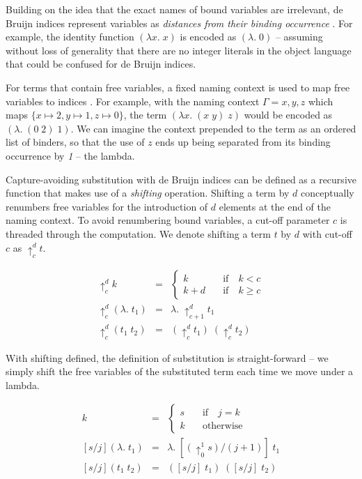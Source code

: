\documentclass[]{unswthesis}
\begin{document}
Building on the idea that the exact names of bound variables are irrelevant, de Bruijn indices represent variables as \textit{distances from their binding occurrence} \cite{deBruijn72}. For example, the identity function $(\lambda x. \; x)$ is encoded as $(\lambda . \; 0)$ -- assuming without loss of generality that there are no integer literals in the object language that could be confused for de Bruijn indices.

For terms that contain free variables, a fixed naming context is used to map free variables to indices \cite{tapl}. For example, with the naming context $\Gamma = x, y, z$ which maps $\{x \mapsto 2, y \mapsto 1, z \mapsto 0\}$, the term $(\lambda x. \; (x \; y) \; z)$ would be encoded as $(\lambda. \; (0 \; 2) \; 1)$. We can imagine the context prepended to the term as an ordered list of binders, so that the use of $z$ ends up being separated from its binding occurrence by \textit{1} -- the lambda.

Capture-avoiding substitution with de Bruijn indices can be defined as a recursive function that makes use of a \textit{shifting} operation. Shifting a term by $d$ conceptually renumbers free variables for the introduction of $d$ elements at the end of the naming context. To avoid renumbering bound variables, a cut-off parameter $c$ is threaded through the computation. We denote shifting a term $t$ by $d$ with cut-off $c$ as $\uparrow^d_c t$.

\begin{eqnarray*}
\uparrow^d_c k & = &
	\begin{cases}
	k \quad & \text{if} \quad k < c \\
	k + d \quad & \text{if} \quad k \geq c
	\end{cases}\\
\uparrow^d_c (\lambda. \; t_1) & = & \lambda. \; \uparrow^d_{c + 1} t_1\\
\uparrow^d_c (t_1 \; t_2) & = & (\uparrow^d_c t_1) \; (\uparrow^d_c t_2)
\end{eqnarray*}

With shifting defined, the definition of substitution is straight-forward -- we simply shift the free variables of the substituted term each time we move under a lambda.

\begin{eqnarray*}
[s/j]k & = &
	\begin{cases}
	s \quad & \text{if} \quad j = k \\
	k \quad & \text{otherwise}
	\end{cases}\\
\left[s/j\right](\lambda. \; t_1) & = & \lambda. \; [(\uparrow^1_0 s)/(j + 1)] \; t_1\\
\left[s/j\right](t_1 \; t_2) & = & ([s/j] \; t_1) \; ([s/j] \; t_2)
\end{eqnarray*}
\end{document}
